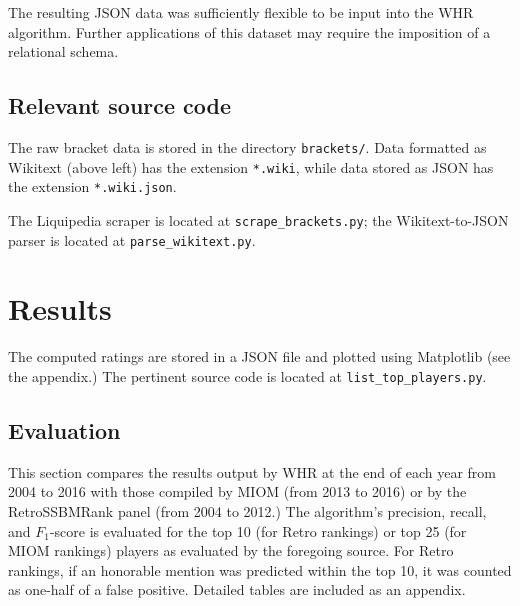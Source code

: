 \documentclass[10pt]{article}
\theoremstyle{definition}
\theoremstyle{remark}
\begin{document}
The resulting JSON data was sufficiently flexible to be input into the WHR
algorithm. Further applications of this dataset may require the imposition
of a relational schema.

\subsection{Relevant source code}
The raw bracket data is stored in the directory \texttt{brackets/}. Data
formatted as Wikitext (above left) has the extension \texttt{*.wiki}, while
data stored as JSON has the extension \texttt{*.wiki.json}.

The Liquipedia scraper is located at \texttt{scrape\_brackets.py}; the
Wikitext-to-JSON parser is located at \texttt{parse\_wikitext.py}.

\section{Results}
The computed ratings are stored in a JSON file and plotted using Matplotlib
(see the appendix.) The pertinent source code is located at \texttt{list\_top\_players.py}.

\subsection{Evaluation}
This section compares the results output by WHR at the end of each year from
2004 to 2016 with those compiled by MIOM (from 2013 to 2016) or by the
RetroSSBMRank panel (from 2004 to 2012.) The algorithm's precision, recall,
and $F_1$-score is evaluated for the top 10 (for Retro rankings) or top 25
(for MIOM rankings) players as evaluated by the foregoing source. For Retro
rankings, if an honorable mention was predicted within the top 10, it was
counted as one-half of a false positive. Detailed tables are included as an
appendix.
\end{document}

